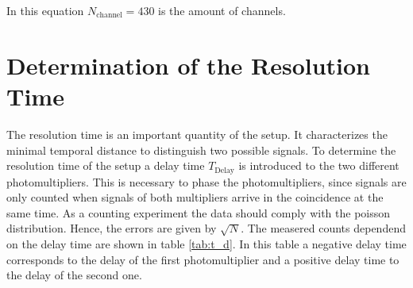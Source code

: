 In this equation $N_\mathrm{channel} = 430$ is the amount of channels.

\section{Determination of the Resolution Time}
\label{sec:resoltion time}
The resolution time is an important quantity of the setup. It characterizes the minimal temporal distance to distinguish two possible signals. %
To determine the resolution time of the setup a delay time $T_\mathrm{Delay}$ is introduced to the two different photomultipliers. This is necessary to phase the photomultipliers,
since signals are only counted when signals of both multipliers arrive in the coincidence at the same time. As a counting experiment the data should comply with the poisson distribution. Hence, the errors are given 
by $\sqrt{N}$. The measered counts dependend on the delay time are shown in table \ref{tab:t_d}. In this table a negative delay time corresponds to the delay of the first 
photomultiplier and a positive delay time to the delay of the second one. 

